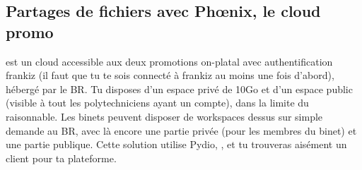 \subsection{Partages de fichiers avec Phœnix, le cloud promo}
\label{phoenix}
 est un cloud accessible aux deux promotions on-platal avec authentification frankiz
(il faut que tu te sois connecté à frankiz au moins une fois d'abord), hébergé par le BR.
Tu disposes d'un espace privé de 10Go et d'un espace public (visible à tout les polytechniciens ayant un compte),
dans la limite du raisonnable. Les binets peuvent disposer de workspaces dessus sur simple demande au BR,
avec là encore une partie privée (pour les membres du binet) et une partie publique.
Cette solution utilise Pydio, ,
et tu trouveras aisément un client pour ta plateforme.

